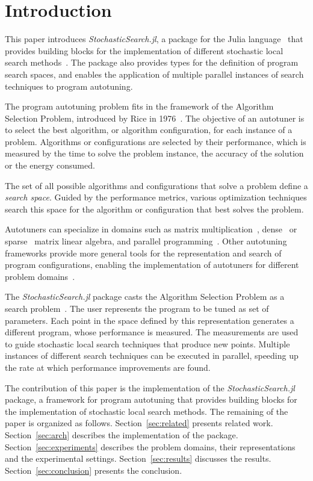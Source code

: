 \section{Introduction} \label{sec:intro}

This paper introduces \emph{StochasticSearch.jl}, a package for the Julia
language~\cite{bezanson2012julia, bezanson2014julia} that provides building
blocks for the implementation of different stochastic local search
methods~\cite{hoos2004stochastic, hoos2015overview}. The package also provides
types for the definition of program search spaces, and enables the application
of multiple parallel instances of search techniques to program autotuning.

The program autotuning problem fits in the framework of the Algorithm Selection
Problem, introduced by Rice in 1976~\cite{rice1976algorithm}. The objective of
an autotuner is to select the best algorithm, or algorithm configuration, for
each instance of a problem.  Algorithms or configurations are selected by their
performance, which is measured by the time to solve the problem instance, the
accuracy of the solution or the energy consumed.

The set of all possible algorithms and configurations that solve a problem
define a \emph{search space}. Guided by the performance metrics, various
optimization techniques search this space for the algorithm or configuration
that best solves the problem.

Autotuners can specialize in domains such as matrix
multiplication~\cite{bilmes1997phipac}, dense~\cite{whaley1998atlas} or
sparse~\cite{vuduc2005oski} matrix linear algebra, and parallel
programming~\cite{jordan2012multi}. Other autotuning frameworks provide more
general tools for the representation and search of program configurations,
enabling the implementation of autotuners for different problem
domains~\cite{ansel2014opentuner, hutter2009paramils}.

The \emph{StochasticSearch.jl} package casts the Algorithm Selection Problem as
a search problem~\cite{ansel2014opentuner, ansel2014phd}. The user represents
the program to be tuned as set of parameters. Each point in the space defined
by this representation generates a different program, whose performance is
measured. The measurements are used to guide stochastic local search techniques
that produce new points.  Multiple instances of different search techniques can
be executed in parallel, speeding up the rate at which performance improvements
are found.

The contribution of this paper is the implementation of the
\emph{StochasticSearch.jl} package, a framework for program autotuning that
provides building blocks for the implementation of stochastic local search
methods.  The remaining of the paper is organized as follows.
Section~\ref{sec:related} presents related work. Section~\ref{sec:arch}
describes the implementation of the package. Section~\ref{sec:experiments}
describes the problem domains, their representations and the experimental
settings. Section~\ref{sec:results} discusses the results.
Section~\ref{sec:conclusion} presents the conclusion.
